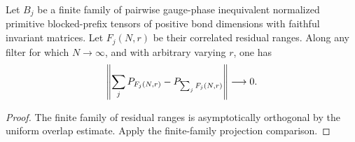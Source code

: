 \begin{lemma}
    \label{thm:residual_sector_projection_sum}
    \leanok
    Let $B_j$ be a finite family of pairwise gauge-phase inequivalent normalized
    primitive blocked-prefix tensors of positive bond dimensions with
    faithful invariant matrices.
    Let $F_j(N,r)$ be their correlated residual ranges. Along any filter for
    which $N\to\infty$, and with arbitrary varying $r$, one has
    \begin{align}
        \left\lVert\sum_jP_{F_j(N,r)}-P_{\sum_jF_j(N,r)}\right\rVert\longrightarrow0.
        \notag
    \end{align}
\end{lemma}
\begin{proof}\leanok
    The finite family of residual ranges is asymptotically orthogonal by the
    uniform overlap estimate. Apply the finite-family projection comparison.
\end{proof}

